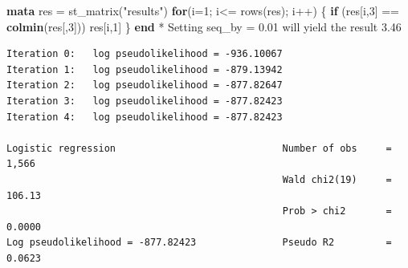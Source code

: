 \documentclass[
  10pt,
]{book}
\newenvironment{Shaded}{\begin{snugshade}}{\end{snugshade}}
\newcommand{\BaseNTok}[1]{\textcolor[rgb]{0.00,0.00,0.81}{#1}}
\newcommand{\KeywordTok}[1]{\textcolor[rgb]{0.13,0.29,0.53}{\textbf{#1}}}
\newcommand{\NormalTok}[1]{#1}
\newcommand{\StringTok}[1]{\textcolor[rgb]{0.31,0.60,0.02}{#1}}
\begin{document}
\begin{Shaded}
\begin{Highlighting}[]
\KeywordTok{mata}
\NormalTok{res = st\_matrix(}\StringTok{"results"}\NormalTok{)}
\KeywordTok{for}\NormalTok{(i=1; i\textless{}= }\BaseNTok{rows}\NormalTok{(res); i++) \{ }
  \KeywordTok{if}\NormalTok{ (res[i,3] == }\KeywordTok{colmin}\NormalTok{(res[,3])) res[i,1]}
\NormalTok{\}}
\KeywordTok{end}
\NormalTok{* Setting seq\_by = 0.01 will yield the result 3.46}
\end{Highlighting}
\end{Shaded}

\begin{verbatim}
Iteration 0:   log pseudolikelihood = -936.10067  
Iteration 1:   log pseudolikelihood = -879.13942  
Iteration 2:   log pseudolikelihood = -877.82647  
Iteration 3:   log pseudolikelihood = -877.82423  
Iteration 4:   log pseudolikelihood = -877.82423  

Logistic regression                             Number of obs     =      1,566
                                                Wald chi2(19)     =     106.13
                                                Prob > chi2       =     0.0000
Log pseudolikelihood = -877.82423               Pseudo R2         =     0.0623


\end{verbatim}
\end{document}
